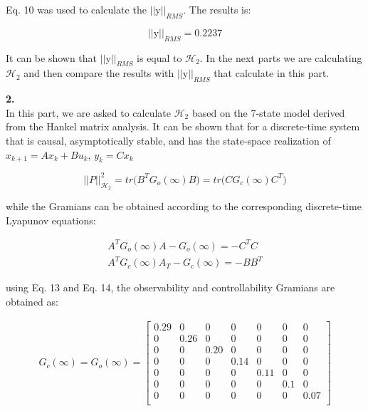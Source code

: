 \documentclass[paper=US leter, fontsize=11pt]{scrartcl}
\begin{document}
 Eq. 10 was used to calculate the $||\text{y}||_{RMS}$. The results is:
 
 \begin{equation}
 \tag{11}
 	||\text{y}||_{RMS} = 0.2237
 \end{equation}
 
 It can be shown that $||\text{y}||_{RMS}$ is equal to $\mathcal{H}_{2}$. In the next parts we are calculating $\mathcal{H}_{2}$ and then compare the results with $||\text{y}||_{RMS}$ that calculate in this part.

\vspace{20pt}
\textbf{2.}\\
In this part, we are asked to calculate $\mathcal{H}_{2}$ based on the 7-state model derived from the Hankel matrix analysis. It can be shown that for a discrete-time system that is causal, asymptotically stable, and has the state-space realization of $x_{k+1} = Ax_{k}+Bu_{k}$, $y_{k}=Cx_{k}$

\begin{equation}
	||P||^{2}_{\mathcal{H}_{2}} = tr\bigg(B^{T}G_{o}(\infty)B\bigg)=tr\bigg(CG_{c}(\infty)C^{T}\bigg)
	\tag{12}
\end{equation}

while the Gramians can be obtained according to the corresponding discrete-time Lyapunov equations:

\begin{gather*}
	A^{T}G_{o}(\infty)A-G_{o}(\infty) = -C^{T}C \tag{13} \\
	A^{T}G_{c}(\infty)A_{T}-G_{c}(\infty) = -BB^{T}
	\tag{14}
\end{gather*}

using Eq. 13 and Eq. 14, the observability and controllability Gramians are obtained as:

\begin{gather*}
	G_{c}(\infty) =	G_{o}(\infty) = \begin{bmatrix}
	0.29 &   0  & 0  &  0 &  0 &   0  & 0\\
	 0 &  0.26 &  0  & 0  &  0 &  0  &  0\\
	0  & 0 &   0.20  &  0 & 0 &  0 & 0\\
	 0  & 0  &  0  &  0.14  & 0 &  0  &  0\\
	0  & 0  & 0 & 0  &  0.11 &  0  & 0\\
	0 & 0  & 0  & 0  & 0 &   0.1 & 0\\
	0  &  0 & 0  &  0  & 0 &  0  &  0.07\\	
	\end{bmatrix}\\
\end{gather*}
\end{document}
